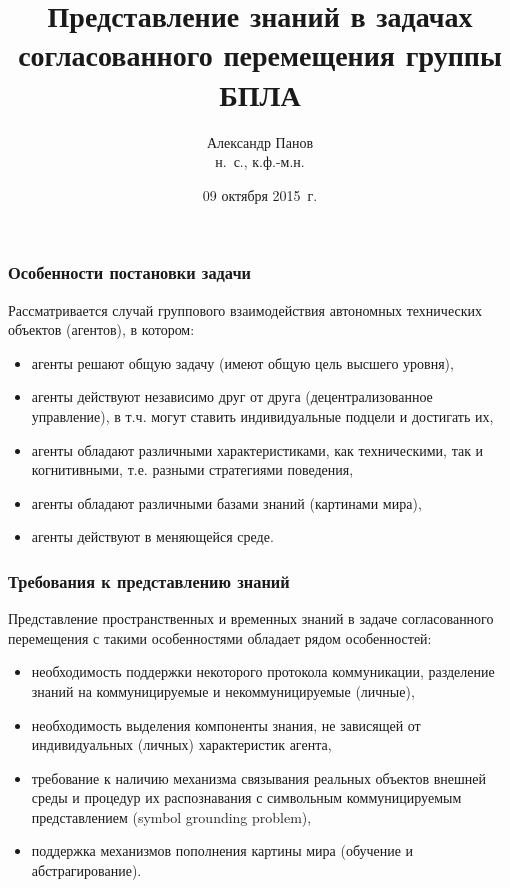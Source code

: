 \documentclass[default]{beamer}
\begin{document}
	
	\title[Представлений знаний, группа БПЛА]{Представление знаний в задачах согласованного перемещения группы БПЛА}
	\author[Панов]{Александр Панов\\н.~с., к.ф.-м.н.}
	\date{09 октября 2015~г.} 
	
	\begin{frame}
		\titlepage
	\end{frame}
	
	\begin{frame}
		\frametitle{Особенности постановки задачи}
		
		Рассматривается случай группового взаимодействия автономных технических объектов (агентов), в котором:
		\begin{itemize}
			\item агенты решают общую задачу (имеют общую цель высшего уровня),
			\item агенты действуют независимо друг от друга (децентрализованное управление), в т.ч. могут ставить индивидуальные подцели и достигать их,
			\item агенты обладают различными характеристиками, как техническими, так и когнитивными, т.е. разными стратегиями поведения,
			\item агенты обладают различными базами знаний (картинами мира),
			\item агенты действуют в меняющейся среде.
		\end{itemize}

	\end{frame}

	\begin{frame}
		\frametitle{Требования к представлению знаний}

		Представление пространственных и временных знаний в задаче согласованного перемещения с такими особенностями обладает рядом особенностей:
		\begin{itemize}
			\item необходимость поддержки некоторого протокола коммуникации, разделение знаний на коммуницируемые и некоммуницируемые (личные),
			\item необходимость выделения компоненты знания, не зависящей от индивидуальных (личных) характеристик агента,
			\item требование к наличию механизма связывания реальных объектов внешней среды и процедур их распознавания с символьным коммуницируемым представлением (symbol grounding problem),
			\item поддержка механизмов пополнения картины мира (обучение и абстрагирование).
		\end{itemize}
	\end{frame}
\end{document}

